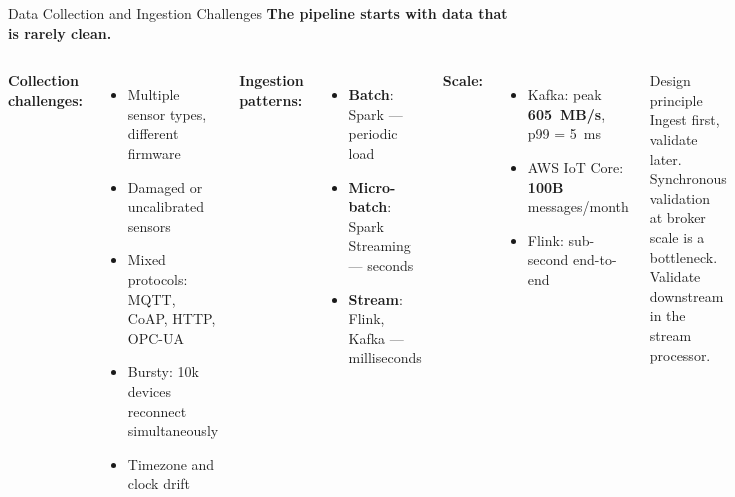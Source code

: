 \documentclass[aspectratio=169,11pt]{beamer}
\begin{document}
\begin{frame}{Data Collection and Ingestion Challenges}
    \small
    \textbf{The pipeline starts with data that is rarely clean.}

    \vspace{0.05cm}
    \begin{columns}
        \textbf{Collection challenges:}
        \begin{itemize}\setlength{\itemsep}{0pt}
            \item Multiple sensor types, different firmware
            \item Damaged or uncalibrated sensors
            \item Mixed protocols: MQTT, CoAP, HTTP, OPC-UA
            \item Bursty: 10k devices reconnect simultaneously
            \item Timezone and clock drift
        \end{itemize}

        \vspace{0.05cm}
        \textbf{Ingestion patterns:}
        \begin{itemize}\setlength{\itemsep}{0pt}
            \item \textbf{Batch}: Spark --- periodic load
            \item \textbf{Micro-batch}: Spark Streaming --- seconds
            \item \textbf{Stream}: Flink, Kafka --- milliseconds
        \end{itemize}

        \textbf{Scale:}
        \begin{itemize}\setlength{\itemsep}{0pt}
            \item Kafka: peak \textbf{605~MB/s}, p99 = 5~ms
            \item AWS IoT Core: \textbf{100B} messages/month
            \item Flink: sub-second end-to-end
        \end{itemize}

        \vspace{0.05cm}
        \begin{alertblock}{Design principle}
            Ingest first, validate later. Synchronous validation at broker scale is a bottleneck. Validate downstream in the stream processor.
        \end{alertblock}
    \end{columns}
\end{frame}
\end{document}
